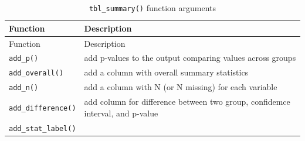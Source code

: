 \documentclass[
]{article}
\begin{document}
\begin{longtable}[]{@{}ll@{}}
\caption{\texttt{tbl\_summary()} function arguments}\tabularnewline
\toprule
\begin{minipage}[b]{0.18\columnwidth}\raggedright
Function\strut
\end{minipage} & \begin{minipage}[b]{0.76\columnwidth}\raggedright
Description\strut
\end{minipage}\tabularnewline
\midrule
\endfirsthead
\toprule
\begin{minipage}[b]{0.18\columnwidth}\raggedright
Function\strut
\end{minipage} & \begin{minipage}[b]{0.76\columnwidth}\raggedright
Description\strut
\end{minipage}\tabularnewline
\midrule
\endhead
\begin{minipage}[t]{0.18\columnwidth}\raggedright
\texttt{add\_p()}\strut
\end{minipage} & \begin{minipage}[t]{0.76\columnwidth}\raggedright
add p-values to the output comparing values across groups\strut
\end{minipage}\tabularnewline
\begin{minipage}[t]{0.18\columnwidth}\raggedright
\texttt{add\_overall()}\strut
\end{minipage} & \begin{minipage}[t]{0.76\columnwidth}\raggedright
add a column with overall summary statistics\strut
\end{minipage}\tabularnewline
\begin{minipage}[t]{0.18\columnwidth}\raggedright
\texttt{add\_n()}\strut
\end{minipage} & \begin{minipage}[t]{0.76\columnwidth}\raggedright
add a column with N (or N missing) for each variable\strut
\end{minipage}\tabularnewline
\begin{minipage}[t]{0.18\columnwidth}\raggedright
\texttt{add\_difference()}\strut
\end{minipage} & \begin{minipage}[t]{0.76\columnwidth}\raggedright
add column for difference between two group, confidemce interval, and
p-value\strut
\end{minipage}\tabularnewline
\begin{minipage}[t]{0.18\columnwidth}\raggedright
\texttt{add\_stat\_label()}\strut
\end{minipage} & \begin{minipage}[t]{0.76\columnwidth}\raggedright

\end{minipage}
\end{longtable}
\end{document}

